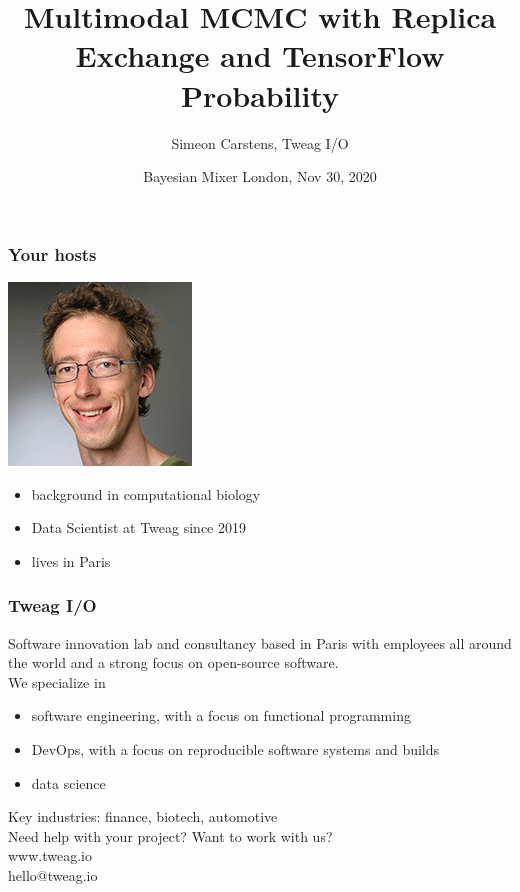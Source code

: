 \documentclass[t,aspectratio=169]{beamer}
\title{Multimodal MCMC with Replica Exchange and TensorFlow Probability}
\date{Bayesian Mixer London, Nov 30, 2020}
\author{Simeon Carstens, Tweag I/O}
\begin{document}
\begin{frame}
  \titlepage
\end{frame}


\begin{frame}
  \frametitle{Your hosts}
  \begin{tcolorbox}[title=Simeon (presentation)]
    \begin{minipage}{0.3\textwidth}{
        \includegraphics[width=0.15\paperwidth]{images/simeon}}
    \end{minipage}
    \begin{minipage}{0.6\textwidth}
    \begin{itemize}
    \item background in computational biology
    \item Data Scientist at Tweag since 2019
    \item lives in Paris
    \end{itemize}
    \end{minipage}
  \end{tcolorbox}
\end{frame}


\begin{frame}
  \frametitle{Tweag I/O}
  Software innovation lab and consultancy based in Paris with employees all around the world and a strong focus on open-source software.\\
  \bigskip
  We specialize in
  \begin{itemize}
  \item software engineering, with a focus on functional programming
  \item DevOps, with a focus on reproducible software systems and builds
  \item data science
  \end{itemize}
  Key industries: finance, biotech, automotive\\
  \bigskip
  Need help with your project? Want to work with us?\\
  \bigskip
  \centering
  www.tweag.io\\
  \bigskip
  hello@tweag.io
\end{frame}
\end{document}
